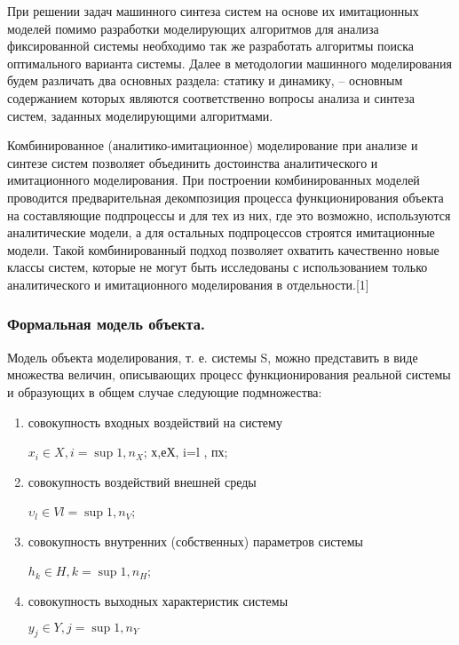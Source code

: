     При решении задач машинного синтеза систем на основе их имитационных моделей помимо разработки моделирующих алгоритмов для анализа фиксированной системы необходимо так же разработать алгоритмы поиска оптимального варианта системы. Далее в методологии машинного моделирования будем различать два основных раздела: статику и динамику, -- основным содержанием которых являются соответственно вопросы анализа и синтеза систем, заданных моделирующими алгоритмами.

    Комбинированное (аналитико-имитационное) моделирование при анализе и синтезе систем позволяет объединить достоинства аналитического и имитационного моделирования. При построении комбинированных моделей проводится предварительная декомпозиция процесса функционирования объекта на составляющие подпроцессы и для тех из них, где это возможно, используются аналитические модели, а для остальных подпроцессов строятся имитационные модели. Такой комбинированный подход позволяет охватить качественно новые классы систем, которые не могут быть исследованы с использованием только аналитического и имитационного моделирования в отдельности.[1]


\subsubsection{Формальная модель объекта.}

Модель объекта моделирования, т. е. системы S, можно представить в виде множества величин, описывающих процесс функционирования реальной системы и образующих в общем случае следующие подмножества:

\begin{enumerate}
  \item совокупность входных воздействий на систему
      \begin{center}
        $x_{i} \in X, i = \sup{1, n_{X}}$; х,еХ, i=l , пх;
      \end{center}

  \item совокупность воздействий внешней среды
     \begin{center}
       $\upsilon_{l} \in V l = \sup{1, n_{V}}$;
     \end{center}

  \item совокупность внутренних (собственных) параметров системы
     \begin{center}
       $h_{k} \in H, k = \sup{1, n_{H}}$;
     \end{center}

  \item совокупность выходных характеристик системы
    \begin{center}
      $y_{j} \in Y, j = \sup{1, n_{Y}}$
    \end{center}

\end{enumerate}

